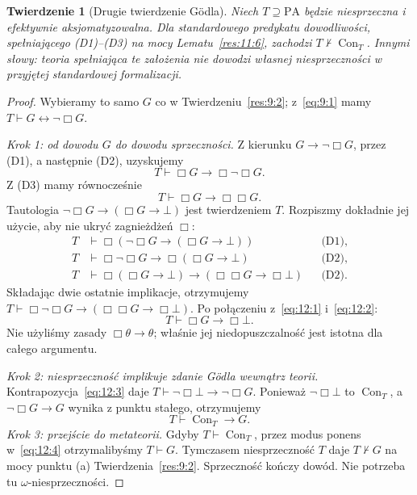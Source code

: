 \documentclass[11pt,a4paper]{article}
\numberwithin{equation}{section}
\theoremstyle{plain}
\newtheorem{twierdzenie}{Twierdzenie}[section]
\theoremstyle{definition}
\theoremstyle{remark}
\begin{document}
\begin{twierdzenie}[Drugie twierdzenie Gödla]\label{res:12:2}
Niech $T\supseteq\mathrm{PA}$ będzie niesprzeczna i efektywnie aksjomatyzowalna. Dla standardowego predykatu dowodliwości, spełniającego (D1)--(D3) na mocy Lematu~\ref{res:11:6}, zachodzi $T\nvdash\operatorname{Con}_T$. Innymi słowy: teoria spełniająca te założenia nie dowodzi własnej niesprzeczności w przyjętej standardowej formalizacji.
\end{twierdzenie}
\begin{proof}
Wybieramy to samo $G$ co w Twierdzeniu~\ref{res:9:2}; z~\eqref{eq:9:1} mamy $T\vdash G\leftrightarrow\neg\Box G$.

\emph{Krok 1: od dowodu $G$ do dowodu sprzeczności.} Z kierunku $G\to\neg\Box G$, przez (D1), a następnie (D2), uzyskujemy
\begin{equation}\label{eq:12:1}
T\vdash\Box G\to\Box\neg\Box G.
\end{equation}
Z (D3) mamy równocześnie
\begin{equation}\label{eq:12:2}
T\vdash\Box G\to\Box\Box G.
\end{equation}
Tautologia $\neg\Box G\to(\Box G\to\bot)$ jest twierdzeniem $T$. Rozpiszmy dokładnie jej użycie, aby nie ukryć zagnieżdżeń $\Box$:
\begin{align*}
T&\vdash\Box(\neg\Box G\to(\Box G\to\bot)) &&\text{(D1)},\\
T&\vdash\Box\neg\Box G\to\Box(\Box G\to\bot) &&\text{(D2)},\\
T&\vdash\Box(\Box G\to\bot)\to(\Box\Box G\to\Box\bot) &&\text{(D2)}.
\end{align*}
Składając dwie ostatnie implikacje, otrzymujemy $T\vdash\Box\neg\Box G\to(\Box\Box G\to\Box\bot)$. Po połączeniu z~\eqref{eq:12:1} i~\eqref{eq:12:2}:
\begin{equation}\label{eq:12:3}
T\vdash\Box G\to\Box\bot.
\end{equation}
Nie użyliśmy zasady $\Box\theta\to\theta$; właśnie jej niedopuszczalność jest istotna dla całego argumentu.

\emph{Krok 2: niesprzeczność implikuje zdanie Gödla wewnątrz teorii.} Kontrapozycja~\eqref{eq:12:3} daje $T\vdash\neg\Box\bot\to\neg\Box G$. Ponieważ $\neg\Box\bot$ to $\operatorname{Con}_T$, a $\neg\Box G\to G$ wynika z punktu stałego, otrzymujemy
\begin{equation}\label{eq:12:4}
T\vdash\operatorname{Con}_T\to G.
\end{equation}
\emph{Krok 3: przejście do metateorii.} Gdyby $T\vdash\operatorname{Con}_T$, przez modus ponens w~\eqref{eq:12:4} otrzymalibyśmy $T\vdash G$. Tymczasem niesprzeczność $T$ daje $T\nvdash G$ na mocy punktu (a) Twierdzenia~\ref{res:9:2}. Sprzeczność kończy dowód. Nie potrzeba tu $\omega$-niesprzeczności.
\end{proof}
\end{document}
